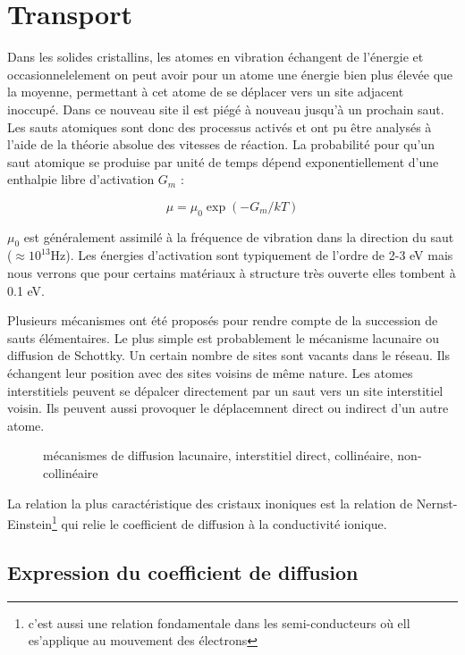 \chapter{Transport}

Dans les solides cristallins, les atomes en vibration échangent de l'énergie et occasionnelelement on peut avoir pour un atome une énergie bien plus élevée que la moyenne, permettant à cet atome de se déplacer vers un site adjacent inoccupé. Dans ce nouveau site il est piégé à nouveau jusqu'à un prochain saut. Les sauts atomiques sont donc des processus activés et ont pu être analysés à l'aide de la théorie absolue des vitesses de réaction. La probabilité pour qu'un saut atomique se produise par unité de temps dépend exponentiellement d'une enthalpie libre d'activation $G_m$ :

\begin{equation}
\mu = \mu_0 \exp (-G_m / kT)
\end{equation}

$\mu_0$ est généralement assimilé à la fréquence de vibration dans la direction du saut ($\approx 10^{13}$Hz). Les énergies d'activation sont typiquement de l'ordre de 2-3 eV mais nous verrons que pour certains matériaux à structure très ouverte elles tombent à 0.1 eV.

Plusieurs mécanismes ont été proposés pour rendre compte de la succession de sauts élémentaires. Le plus simple est probablement le mécanisme lacunaire ou diffusion de Schottky. Un certain nombre de sites sont vacants dans le réseau. Ils échangent leur position avec des sites voisins de même nature. Les atomes interstitiels peuvent se dépalcer directement par un saut vers un site interstitiel voisin. Ils peuvent aussi provoquer le déplacemnent direct ou indirect d'un autre atome.

\begin{figure}
\TODO
\caption{mécanismes de diffusion lacunaire, interstitiel direct, collinéaire, non-collinéaire}
\label{mecanismestransport}
\end{figure}

La relation la plus caractéristique des cristaux inoniques est la relation de Nernst-Einstein\footnote{c'est aussi une relation fondamentale dans les semi-conducteurs où ell es'applique au mouvement des électrons} qui relie le coefficient de diffusion à la conductivité ionique.

\section{Expression du coefficient de diffusion}

